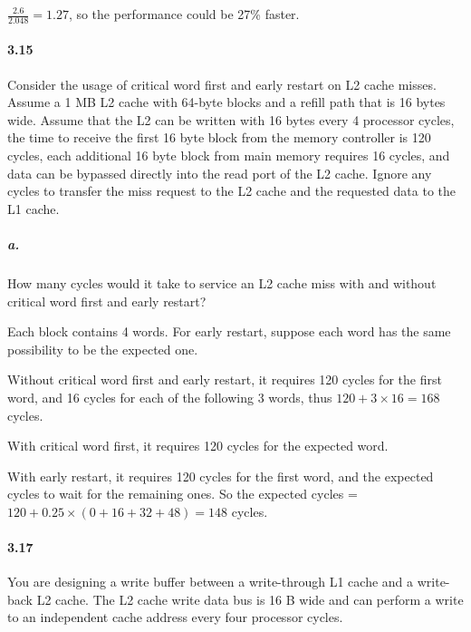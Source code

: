 \documentclass{article}
\begin{document}
$\frac{2.6}{2.048}=1.27$, so the performance could be 27\% faster.



\paragraph{3.15} Consider the usage of critical word first and early restart on L2 cache misses. Assume a 1 MB L2 cache with 64-byte blocks and a refill path that is 16 bytes wide. Assume that the L2 can be written with 16 bytes every 4 processor cycles, the time to receive the first 16 byte block from the memory controller is 120 cycles, each additional 16 byte block from main memory requires 16 cycles, and data can be bypassed directly into the read port of the L2 cache. Ignore any cycles to transfer the miss request to the L2 cache and the requested data to the L1 cache.

\subparagraph{a.} How many cycles would it take to service an L2 cache miss with and without critical word first and early restart?

Each block contains 4 words. For early restart, suppose each word has the same possibility to be the expected one.

Without critical word first and early restart, it requires 120 cycles for the first word, and 16 cycles for each of the following 3 words, thus $120+3\times16=168$ cycles.

With critical word first, it requires 120 cycles for the expected word.

With early restart, it requires 120 cycles for the first word, and the expected cycles to wait for the remaining ones. So the expected cycles = $120 + 0.25\times(0 + 16 + 32 + 48) = 148$ cycles.

\paragraph{3.17} You are designing a write buffer between a write-through L1 cache and a write-back L2 cache. The L2 cache write data bus is 16 B wide and can perform a write to an independent cache address every four processor cycles.
\end{document}
